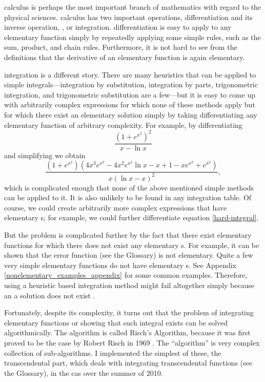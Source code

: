 \Gls{calculus} is perhaps the most important branch of mathematics with
regard to the physical sciences.  \Gls{calculus} has two important
operations, \gls{differentiation} and its inverse operation,
\Antidifferentiation, or \gls{integration}.  \Gls{differentiation} is
easy to apply to any \gls{elementary} function simply by repeatedly
applying some simple rules, such as the sum, product, and chain rules.
Furthermore, it is not hard to see from the definitions that the
derivative of an \gls{elementary} function is again \gls{elementary}.

\Gls{integration} is a different story.  There are many heuristics that
can be applied to simple integrals---\gls{integration} by substitution,
\gls{integration} by parts, trigonometric \gls{integration}, and
trigonometric substitution are a few---but it is easy to come up with
arbitrarily complex expressions for which none of these methods apply
but for which there exist an \gls{elementary} solution simply by taking
differentiating any elementary function of arbitrary complexity.  For
example, by differentiating
\begin{equation}
\label{hard-integral-sol}
\frac{\left(1 + e^{x^{2}}\right)^{2}}{x - \ln{x}}
\end{equation}
and simplifying we obtain
\begin{equation}
\label{hard-integral}
    \frac{\left( 1 + e^{x^2} \right)
        \left(4x^3e^{x^2} - 4x^2e^{x^2}\ln{x} - x + 1 - xe^{x^2} +
        e^{x^2}\right)}
    {x\left(\ln{x} - x\right)^2},
\end{equation}
which is complicated enough that none of the above mentioned simple
methods can be applied to it.  It is also unlikely to be found in any
integration table.  Of course, we could create arbitrarily more complex
expressions that have elementary \Antiderivative s; for example, we
could further differentiate equation \ref{hard-integral}. 

But the problem is complicated further by the fact that there exist
\gls{elementary} functions for which there does not exist any
\gls{elementary} \Antiderivative s.  For example, it can be shown that
the \gls{error function} (see the Glossary) is not elementary.  Quite a
few very simple elementary functions do not have elementary
\Antiderivative s.  See Appendix \ref{nonelementary_examples_appendix}
for some common examples. Therefore, using a heuristic based
\gls{integration} method might fail altogether simply because an a
solution does not exist .

Fortunately, despite its complexity, it turns out that the problem of
integrating elementary functions or showing that such integral exists
can be solved algorithmically.  The algorithm is called Risch's
Algorithm, because it was first proved to be the case by Robert Risch in
1969 \cite{risch1969problem}.  The ``algorithm'' is very complex
collection of sub-algorithms.  I implemented the simplest of these, the
\gls{transcendental} part, which deals with integrating
\gls{transcendental} functions (see the Glossary), in the \sympy
\gls{cas} over the summer of 2010.
